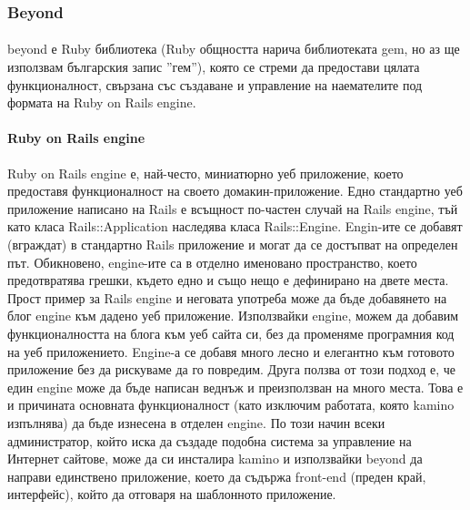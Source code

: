 \documentclass[pdftex,14pt,a4paper]{extreport}
\begin{document}
\subsubsection {Beyond}
\paragraph {}
beyond е Ruby библиотека (Ruby общността нарича библиотеката gem, но аз ще използвам българския запис ''гем''), която се стреми да предостави цялата функционалност, свързана със създаване и управление на наемателите под формата на Ruby on Rails engine.
\paragraph {Ruby on Rails engine}
Ruby on Rails engine е, най-често, миниатюрно уеб приложение, което предоставя функционалност на своето домакин-приложение. Едно стандартно уеб приложение написано на Rails е всъщност по-частен случай на Rails engine, тъй като класа Rails::Application наследява класа Rails::Engine. Engin-ите се добавят (вграждат) в стандартно Rails приложение и могат да се достъпват на определен път. Обикновено, engine-ите са в отделно именовано пространство, което предотвратява грешки, където едно и също нещо е дефинирано на двете места. Прост пример за Rails engine и неговата употреба може да бъде добавянето на блог engine към дадено уеб приложение. Използвайки engine, можем да добавим функционалността на блога към уеб сайта си, без да променяме програмния код на уеб приложението. Engine-а се добавя много лесно и елегантно към готовото приложение без да рискуваме да го повредим. Друга ползва от този подход е, че един engine може да бъде написан веднъж и преизползван на много места. Това е и причината основната функционалност (като изключим работата, която kamino изпълнява) да бъде изнесена в отделен engine. По този начин всеки администратор, който иска да създаде подобна система за управление на Интернет сайтове, може да си инсталира kamino и използвайки beyond да направи единствено приложение, което да съдържа front-end (преден край, интерфейс), който да отговаря на шаблонното приложение.
\end{document}

